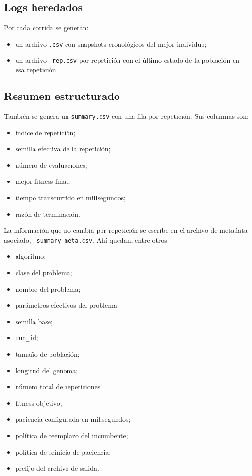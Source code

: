 \documentclass[11pt]{article}
\begin{document}
\subsection{Logs heredados}

Por cada corrida se generan:

\begin{itemize}
  \item un archivo \texttt{.csv} con snapshots cronol\'ogicos del mejor
  individuo;
  \item un archivo \texttt{\_rep.csv} por repetici\'on con el \'ultimo estado de
  la poblaci\'on en esa repetici\'on.
\end{itemize}

\subsection{Resumen estructurado}

Tambi\'en se genera un \texttt{summary.csv} con una fila por repetici\'on. Sus
columnas son:

\begin{itemize}
  \item \'indice de repetici\'on;
  \item semilla efectiva de la repetici\'on;
  \item n\'umero de evaluaciones;
  \item mejor fitness final;
  \item tiempo transcurrido en milisegundos;
  \item raz\'on de terminaci\'on.
\end{itemize}

La informaci\'on que no cambia por repetici\'on se escribe en el archivo de
metadata asociado, \texttt{\_summary\_meta.csv}. Ah\'i quedan, entre otros:

\begin{itemize}
  \item algoritmo;
  \item clase del problema;
  \item nombre del problema;
  \item par\'ametros efectivos del problema;
  \item semilla base;
  \item \texttt{run\_id};
  \item tama\~no de poblaci\'on;
  \item longitud del genoma;
  \item n\'umero total de repeticiones;
  \item fitness objetivo;
  \item paciencia configurada en milisegundos;
  \item pol\'itica de reemplazo del incumbente;
  \item pol\'itica de reinicio de paciencia;
  \item prefijo del archivo de salida.
\end{itemize}
\end{document}
